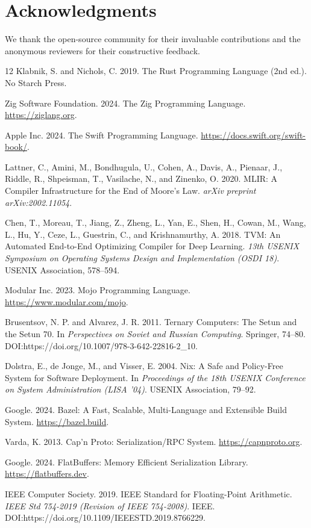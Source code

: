 \documentclass[sigconf, 10pt]{acmart}
\begin{document}
\section{Acknowledgments}
We thank the open-source community for their invaluable contributions and the anonymous reviewers for their constructive feedback.

\begin{thebibliography}{12}
Klabnik, S. and Nichols, C. 2019. The Rust Programming Language (2nd ed.). No Starch Press.

Zig Software Foundation. 2024. The Zig Programming Language. \url{https://ziglang.org}.

Apple Inc. 2024. The Swift Programming Language. \url{https://docs.swift.org/swift-book/}.

Lattner, C., Amini, M., Bondhugula, U., Cohen, A., Davis, A., Pienaar, J., Riddle, R., Shpeisman, T., Vasilache, N., and Zinenko, O. 2020. MLIR: A Compiler Infrastructure for the End of Moore's Law. \textit{arXiv preprint arXiv:2002.11054}.

Chen, T., Moreau, T., Jiang, Z., Zheng, L., Yan, E., Shen, H., Cowan, M., Wang, L., Hu, Y., Ceze, L., Guestrin, C., and Krishnamurthy, A. 2018. TVM: An Automated End-to-End Optimizing Compiler for Deep Learning. \textit{13th USENIX Symposium on Operating Systems Design and Implementation (OSDI 18)}. USENIX Association, 578--594.

Modular Inc. 2023. Mojo Programming Language. \url{https://www.modular.com/mojo}.

Brusentsov, N. P. and Alvarez, J. R. 2011. Ternary Computers: The Setun and the Setun 70. In \textit{Perspectives on Soviet and Russian Computing}. Springer, 74--80. DOI:https://doi.org/10.1007/978-3-642-22816-2_10.

Dolstra, E., de Jonge, M., and Visser, E. 2004. Nix: A Safe and Policy-Free System for Software Deployment. In \textit{Proceedings of the 18th USENIX Conference on System Administration (LISA '04)}. USENIX Association, 79--92.

Google. 2024. Bazel: A Fast, Scalable, Multi-Language and Extensible Build System. \url{https://bazel.build}.

Varda, K. 2013. Cap'n Proto: Serialization/RPC System. \url{https://capnproto.org}.

Google. 2024. FlatBuffers: Memory Efficient Serialization Library. \url{https://flatbuffers.dev}.

IEEE Computer Society. 2019. IEEE Standard for Floating-Point Arithmetic. \textit{IEEE Std 754-2019 (Revision of IEEE 754-2008)}. IEEE. DOI:https://doi.org/10.1109/IEEESTD.2019.8766229.

\end{thebibliography}
\appendix
\end{document}
